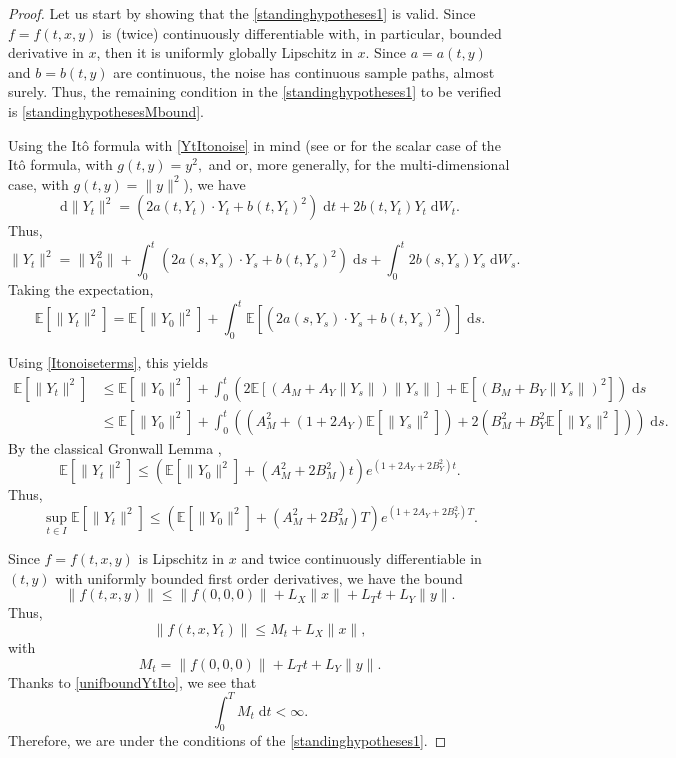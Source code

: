 \documentclass[reqno,12pt]{amsart}
\theoremstyle{plain} %
\theoremstyle{definition} %
\begin{document}
\begin{proof}
    Let us start by showing that the \cref{standinghypotheses1} is valid. Since $f=f(t, x, y)$ is (twice) continuously differentiable with, in particular, bounded derivative in $x$, then it is uniformly globally Lipschitz in $x$. Since $a=a(t, y)$ and $b=b(t, y)$ are continuous, the noise has continuous sample paths, almost surely. Thus, the remaining condition in the \cref{standinghypotheses1} to be verified is \eqref{standinghypothesesMbound}.

    Using the It\^o formula with \eqref{YtItonoise} in mind (see \cite[Theorem 4.1.2]{Oksendal2003} or \cite[Section 7.4]{Kuo2006} for the scalar case of the It\^o formula, with $g(t, y) = y^2,$ and \cite[Theorem 4.2.1]{Oksendal2003} or, more generally, \cite[Section 7.5]{Kuo2006} for the multi-dimensional case, with $g(t, y) = \|y\|^2$), we have
    \[
        \mathrm{d}\|Y_t\|^2 = \left(2a(t, Y_t) \cdot Y_t  + b(t, Y_t)^2 \right) \;\mathrm{d}t + 2b(t, Y_t) Y_t\;\mathrm{d}W_t.
    \]
    Thus,
    \[
        \|Y_t\|^2 = \|Y_0^2\| + \int_0^t \left(2a(s, Y_s)\cdot Y_s  + b(t, Y_s)^2 \right) \;\mathrm{d}s + \int_0^t 2b(s, Y_s) Y_s\;\mathrm{d}W_s.
    \]
    Taking the expectation,
    \[
        \mathbb{E}[\|Y_t\|^2] = \mathbb{E}[\|Y_0\|^2] + \int_0^t \mathbb{E}\left[\left(2a(s, Y_s) \cdot Y_s  + b(t, Y_s)^2 \right)\right] \;\mathrm{d}s.
    \]

    Using \eqref{Itonoiseterms}, this yields
    \begin{align*}
        \mathbb{E}[\|Y_t\|^2] & \leq \mathbb{E}[\|Y_0\|^2] + \int_0^t \left(2\mathbb{E}[(A_M + A_Y \|Y_s\|) \|Y_s\|]  + \mathbb{E}[(B_M + B_Y\|Y_s\|)^2] \right) \;\mathrm{d}s \\
        & \leq \mathbb{E}[\|Y_0\|^2] + \int_0^t \left((A_M^2 + (1 + 2A_Y) \mathbb{E}[\|Y_s\|^2])  + 2(B_M^2 + B_Y^2\mathbb{E}[\|Y_s\|^2]) \right) \;\mathrm{d}s.
    \end{align*}
    By the classical Gronwall Lemma \cite{Gronwall1919},
    \[
        \mathbb{E}[\|Y_t\|^2] \leq \left( \mathbb{E}[\|Y_0\|^2] + (A_M^2 + 2B_M^2)t\right)e^{(1 + 2A_Y + 2B_Y^2)t}.
    \]
    Thus,
    \begin{equation}
        \label{unifboundYtIto}
        \sup_{t\in I}\mathbb{E}[\|Y_t\|^2] \leq \left( \mathbb{E}[\|Y_0\|^2] + (A_M^2 + 2B_M^2)T\right)e^{(1 + 2A_Y + 2B_Y^2)T}.
    \end{equation}

    Since $f=f(t, x, y)$ is Lipschitz in $x$ and twice continuously differentiable in $(t, y)$ with uniformly bounded first order derivatives, we have the bound
    \[
        \|f(t, x, y)\| \leq \|f(0, 0, 0)\| + L_X\|x\| + L_T t + L_Y\|y\|.
    \]
    Thus,
    \[
        \|f(t, x, Y_t)\| \leq M_t + L_X\|x\|,
    \]
    with
    \[
        M_t = \|f(0, 0, 0)\| + L_T t + L_Y\|y\|.
    \]
    Thanks to \eqref{unifboundYtIto}, we see that
    \[
        \int_0^T M_t\;\mathrm{d}t < \infty.
    \]
    Therefore, we are under the conditions of the \cref{standinghypotheses1}.


\end{proof}
\end{document}
